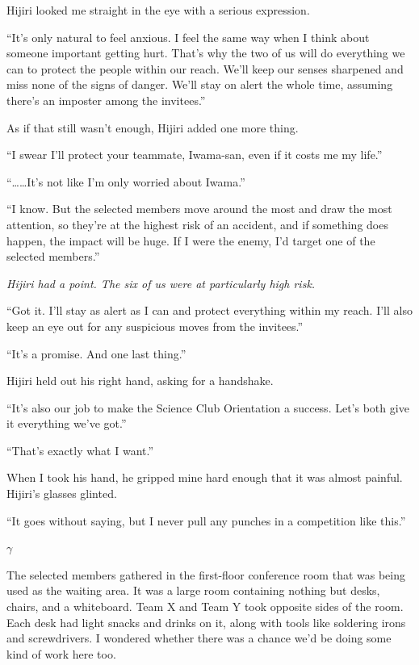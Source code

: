 \documentclass[
    a4paper,
    12pt,
    twoside,
    openany,
    UTF8,
    fontset=windows
]{ctexbook}
\begin{document}
Hijiri looked me straight in the eye with a serious expression.

``It's only natural to feel anxious. I feel the same way when I think about someone important getting hurt. That's why the two of us will do everything we can to protect the people within our reach. We'll keep our senses sharpened and miss none of the signs of danger. We'll stay on alert the whole time, assuming there's an imposter among the invitees.''

As if that still wasn't enough, Hijiri added one more thing.

``I swear I'll protect your teammate, Iwama-san, even if it costs me my life.''

``\dots\dots It's not like I'm only worried about Iwama.''

``I know. But the selected members move around the most and draw the most attention, so they're at the highest risk of an accident, and if something does happen, the impact will be huge. If I were the enemy, I'd target one of the selected members.''

\textit{Hijiri had a point. The six of us were at particularly high risk.}

``Got it. I'll stay as alert as I can and protect everything within my reach. I'll also keep an eye out for any suspicious moves from the invitees.''

``It's a promise. And one last thing.''

Hijiri held out his right hand, asking for a handshake.

``It's also our job to make the Science Club Orientation a success. Let's both give it everything we've got.''

``That's exactly what I want.''

When I took his hand, he gripped mine hard enough that it was almost painful. Hijiri's glasses glinted.

``It goes without saying, but I never pull any punches in a competition like this.''

$\gamma$

The selected members gathered in the first-floor conference room that was being used as the waiting area. It was a large room containing nothing but desks, chairs, and a whiteboard. Team X and Team Y took opposite sides of the room. Each desk had light snacks and drinks on it, along with tools like soldering irons and screwdrivers. I wondered whether there was a chance we'd be doing some kind of work here too.
\end{document}
